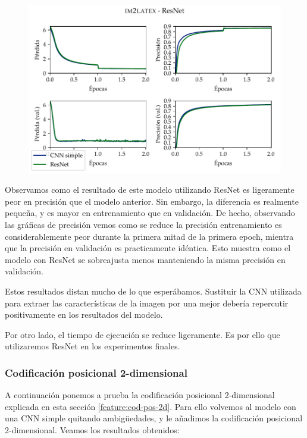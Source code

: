 \documentclass[a4paper, 20pt, dvipsnames]{article}
\begin{document}
\begin{figure}[H]
	\centering
	\includegraphics{fig/im2latex-3b.pdf}
\end{figure}

Observamos como el resultado de este modelo utilizando ResNet es ligeramente peor en
precisión que el modelo anterior. Sin embargo, la diferencia es realmente pequeña, y
es mayor en entrenamiento que en validación. De hecho, observando las gráficas de
precisión vemos como se reduce la precisión entrenamiento es considerablemente peor
durante la primera mitad de la primera epoch, mientra que la precisión en validación
es practicamente idéntica. Esto muestra como el modelo con ResNet se sobreajusta menos
manteniendo la misma precisión en validación. 

Estos resultados distan mucho de lo que esperábamos. Sustituir la CNN utilizada para
extraer las características de la imagen por una mejor debería repercutir positivamente
en los resultados del modelo.

Por otro lado, el tiempo de ejecución se reduce ligeramente. Es por ello que utilizaremos
ResNet en los experimentos finales.


\subsubsection{Codificación posicional 2-dimensional}
\label{exp:3c}

A continuación ponemos a prueba la codificación posicional 2-dimensional explicada en
esta sección \ref{feature:cod-pos-2d}. Para ello volvemos al modelo con una CNN simple
quitando ambigüedades, y le añadimos la codificación posicional 2-dimensional. Veamos
los resultados obtenidos:
\end{document}
